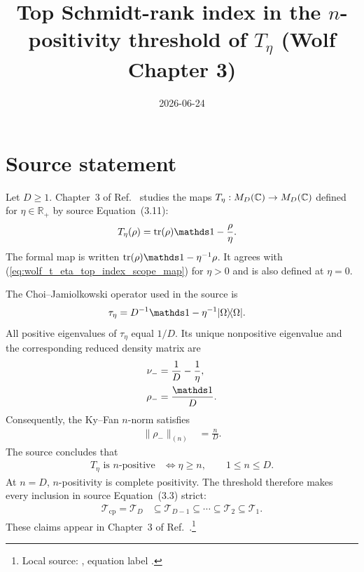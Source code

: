 \documentclass{article}
\title{Top Schmidt-rank index in the $n$-positivity threshold of $T_\eta$
(Wolf Chapter 3)}
\author{}
\date{2026-06-24}
\begin{document}
\maketitle
{}

\section{Source statement}

Let $D\geq1$. Chapter~3 of Ref.~\cite{Wolf2012Quantum} studies the maps
$T_\eta:M_{D}(\mathbb{C})\to M_{D}(\mathbb{C})$ defined for $\eta\in\mathbb R_+$ by source
Equation~(3.11):
\begin{align}
  T_\eta(\rho)
    &=\tr(\rho)\Id-\frac{\rho}{\eta}.
  \label{eq:wolf_t_eta_top_index_scope_map}
\end{align}
The formal map is written $\tr(\rho)\Id-\eta^{-1}\rho$. It agrees with
(\ref{eq:wolf_t_eta_top_index_scope_map}) for $\eta>0$ and is also defined at
$\eta=0$.

The Choi--Jamiolkowski operator used in the source is
\begin{align}
  \tau_\eta
    &=D^{-1}\Id-\eta^{-1}\ketbra{\Omega}{\Omega}.
  \label{eq:wolf_t_eta_top_index_scope_choi_operator}
\end{align}
All positive eigenvalues of $\tau_\eta$ equal $1/D$. Its unique nonpositive
eigenvalue and the corresponding reduced density matrix are
\begin{align}
  \nu_-
    &=\frac{1}{D}-\frac{1}{\eta},
  \label{eq:wolf_t_eta_top_index_scope_negative_eigenvalue}\\
  \rho_-
    &=\frac{\Id}{D}.
  \label{eq:wolf_t_eta_top_index_scope_reduced_density}
\end{align}
Consequently, the Ky--Fan $n$-norm satisfies
\begin{align}
  \|\rho_-\|_{(n)}
    &=\frac{n}{D}.
  \label{eq:wolf_t_eta_top_index_scope_ky_fan_norm}
\end{align}
The source concludes that
\begin{align}
  T_\eta\text{ is $n$-positive}
    &\Longleftrightarrow \eta\geq n,
  \qquad 1\leq n\leq D.
  \label{eq:wolf_t_eta_top_index_scope_full_threshold}
\end{align}
At $n=D$, $n$-positivity is complete positivity. The threshold therefore makes
every inclusion in source Equation~(3.3) strict:
\begin{align}
  \mathcal T_{\mathrm{cp}}=\mathcal T_D
    &\subseteq\mathcal T_{D-1}
      \subseteq\cdots\subseteq\mathcal T_2
      \subseteq\mathcal T_1.
  \label{eq:wolf_t_eta_top_index_scope_positivity_chain}
\end{align}
These claims appear in Chapter~3 of Ref.~\cite{Wolf2012Quantum}.\footnote{Local
source:
,
equation label .}
\end{document}
